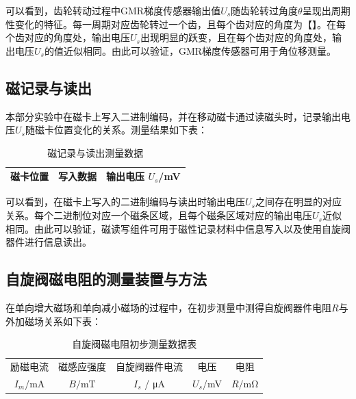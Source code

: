 \documentclass{thuemp}
\begin{document}
可以看到，齿轮转动过程中GMR梯度传感器输出值$U_s$随齿轮转过角度$\theta$呈现出周期性变化的特征。每一周期对应齿轮转过一个齿，且每个齿对应的角度为【】。在每个齿对应的角度处，输出电压$U_s$出现明显的跃变，且在每个齿对应的角度处，输出电压$U_s$的值近似相同。由此可以验证，GMR梯度传感器可用于角位移测量。

\subsection{磁记录与读出}

本部分实验中在磁卡上写入二进制编码，并在移动磁卡通过读磁头时，记录输出电压$U_s$随磁卡位置变化的关系。测量结果如下表：

\begin{table}[H]
    \centering
    \captionnamefont{\wuhao\bf\heiti}
    \captiontitlefont{\wuhao\bf\heiti}
    \caption{磁记录与读出测量数据} \label{tab:magnetic_record}
    \liuhao
    \begin{tabular}{ccc}
        \toprule
        磁卡位置 & 写入数据& 输出电压 $U_s$/\si{\milli\volt} \\ \hline
        \midrule
        \bottomrule
    \end{tabular}
\end{table}

可以看到，在磁卡上写入的二进制编码与读出时输出电压$U_s$之间存在明显的对应关系。每个二进制位对应一个磁条区域，且每个磁条区域对应的输出电压$U_s$近似相同。由此可以验证，磁读写组件可用于磁性记录材料中信息写入以及使用自旋阀器件进行信息读出。

\subsection{自旋阀磁电阻的测量装置与方法}
在单向增大磁场和单向减小磁场的过程中，在初步测量中测得自旋阀器件电阻$R$与外加磁场关系如下表：
\begin{table}[H]
    \centering
    \captionnamefont{\wuhao\bf\heiti}
    \captiontitlefont{\wuhao\bf\heiti}
    \caption{自旋阀磁电阻初步测量数据表} \label{tab:spin_valve}
    \liuhao
    \begin{tabular}{ccccc}
        \toprule
        励磁电流& 磁感应强度 & 自旋阀器件电流 & 电压 & 电阻 \\
        $I_m$/\si{\milli\ampere} & $B/$\si{\milli\tesla} & $I_s$ / \si{\micro\ampere} & $U_s$/\si{\milli\volt} & $R/$\si{\milli\ohm} \\
        \midrule
        \bottomrule
    \end{tabular}
\end{table}
\end{document}
